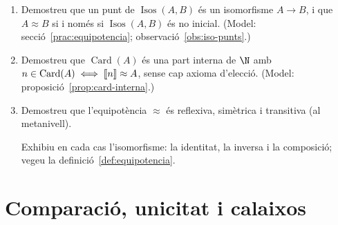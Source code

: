 \begin{enumerate}[resume]
  \item Demostreu que un punt de \(\operatorname{Isos}(A,B)\) és un isomorfisme \(A\to B\), i que \(A\approx B\) si i només si \(\operatorname{Isos}(A,B)\) és no inicial. (Model: secció~\ref{prac:equipotencia}; observació~\ref{obs:iso-punts}.)

  \item Demostreu que \(\operatorname{Card}(A)\) és una part interna de \(\N\) amb \(n\in\operatorname{Card}(A)\iff\llbracket n\rrbracket\approx A\), sense cap axioma d'elecció. (Model: proposició~\ref{prop:card-interna}.)

  \item Demostreu que l'equipotència \(\approx\) és reflexiva, simètrica i transitiva (al metanivell). \begin{indicacio}Exhibiu en cada cas l'isomorfisme: la identitat, la inversa i la composició; vegeu la definició~\ref{def:equipotencia}.\end{indicacio}
\end{enumerate}

\section{Comparació, unicitat i calaixos}

